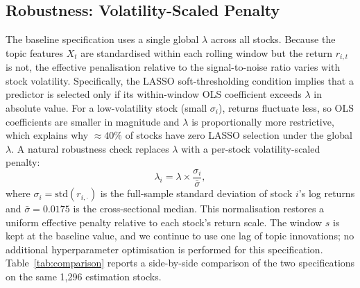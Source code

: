 \subsection{Robustness: Volatility-Scaled Penalty}

The baseline specification uses a single global $\lambda$ across all stocks.
Because the topic features $X_t$ are standardised within each rolling window but the
return $r_{i,t}$ is not, the effective penalisation relative to the signal-to-noise
ratio varies with stock volatility.
Specifically, the LASSO soft-thresholding condition implies that a predictor is selected
only if its within-window OLS coefficient exceeds $\lambda$ in absolute value.
For a low-volatility stock (small $\sigma_i$), returns fluctuate less, so OLS coefficients
are smaller in magnitude and $\lambda$ is proportionally more restrictive, which explains
why $\approx 40\%$ of stocks have zero LASSO selection under the global $\lambda$.
A natural robustness check replaces $\lambda$ with a per-stock volatility-scaled penalty:
\begin{equation}\label{eq:volscaled_lambda}
\lambda_i = \lambda \times \frac{\sigma_i}{\bar\sigma},
\end{equation}
where $\sigma_i = \mathrm{std}(r_{i,\cdot})$ is the full-sample standard deviation of stock $i$'s
log returns and $\bar\sigma = 0.0175$ is the cross-sectional median.
This normalisation restores a uniform effective penalty relative to each stock's return scale.
The window $s$ is kept at the baseline value, and we continue to use one lag of topic innovations; no additional hyperparameter
optimisation is performed for this specification.
Table~\ref{tab:comparison} reports a side-by-side comparison of the two specifications on the
same 1,296 estimation stocks.
 
